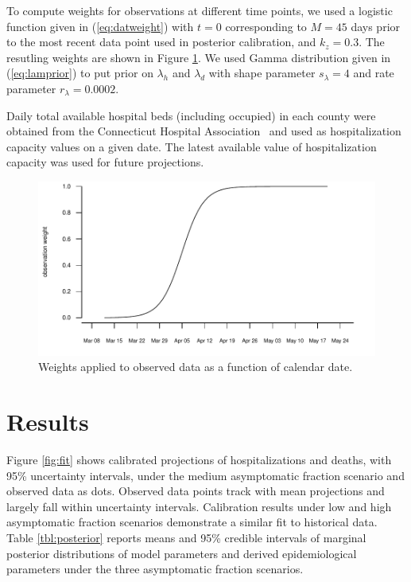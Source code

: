 \documentclass[11pt]{article}
\begin{document}
To compute weights for observations at different time points, we used a logistic function given in (\ref{eq:datweight}) with $t=0$ corresponding to $M = 45$ days prior to the most recent data point used in posterior calibration, and $k_z = 0.3$. The resutling weights are shown in Figure \ref{fig:datweights}.
We used Gamma distribution given in (\ref{eq:lamprior}) to put prior on $\lambda_h$ and $\lambda_d$ with shape parameter $s_\lambda = 4$ and rate parameter $r_\lambda = 0.0002$.

Daily total available hospital beds (including occupied) in each county were obtained from the Connecticut Hospital Association~\citep{CHAwebsite} and used as hospitalization capacity values on a given date. The latest available value of hospitalization capacity was used for future projections.

\begin{figure} %
	\centering
	\includegraphics[width=.6\textwidth]{figures/data_weights.pdf}
	\caption{Weights applied to observed data as a function of calendar date.}
	\label{fig:datweights}
\end{figure}






\section{Results}


Figure \ref{fig:fit} shows calibrated projections of hospitalizations and deaths, with 95\% uncertainty intervals, under the medium asymptomatic fraction scenario and observed data as dots.  Observed data points track with mean projections and largely fall within uncertainty intervals.  Calibration results under low and high asymptomatic fraction scenarios demonstrate a similar fit to historical data.  
Table \ref{tbl:posterior} reports means and 95\% credible intervals of marginal posterior distributions of model parameters and derived epidemiological parameters under the three asymptomatic fraction scenarios.
\end{document}
